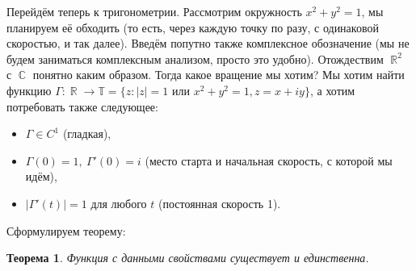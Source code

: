 \documentclass[a4paper,100pt]{article}
\theoremstyle{indented}
\newtheorem{theorem}{Теорема}
\theoremstyle{definition}
\theoremstyle{remark}
\DeclareMathOperator{\CC}{\mathbb{C}}
\DeclareMathOperator{\RR}{\mathbb{R}}
\begin{document}
Перейдём теперь к тригонометрии. Рассмотрим окружность $x^2+y^2=1$, мы планируем её обходить (то есть, через каждую точку по разу, с одинаковой скоростью, и так далее). Введём попутно также комплексное обозначение (мы не будем заниматься комплексным анализом, просто это удобно). Отождествим $\RR^2$ с $\CC$ понятно каким образом. Тогда какое вращение мы хотим? Мы хотим найти функцию $\Gamma:\RR\rightarrow \mathbb{T}=\{z:|z|=1 \text{ или } x^2+y^2=1, z=x+iy\}$, а хотим потребовать также следующее:

\begin{itemize}
    \item $\Gamma\in C^1$ (гладкая),
    \item $\Gamma(0)=1, \: \Gamma'(0)=i$ (место старта и начальная скорость, с которой мы идём), 
    \item $|\Gamma'(t)|=1$ для любого $t$ (постоянная скорость 1).
\end{itemize}

Сформулируем теорему:\\

\begin{theorem}
    Функция с данными свойствами существует и единственна.
\end{theorem}
\end{document}
